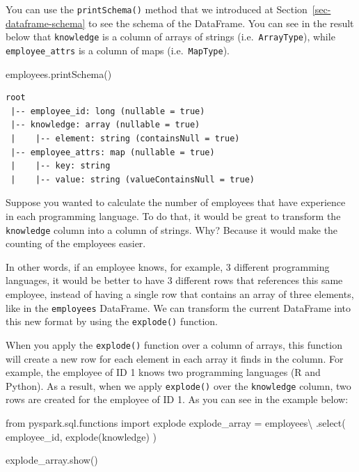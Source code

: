 \documentclass[
  11pt,
  letterpaper,
  DIV=11,
  numbers=noendperiod]{scrreprt}
\newenvironment{Shaded}{\begin{snugshade}}{\end{snugshade}}
\newcommand{\ImportTok}[1]{\textcolor[rgb]{0.00,0.46,0.62}{#1}}
\newcommand{\NormalTok}[1]{\textcolor[rgb]{0.00,0.23,0.31}{#1}}
\newcommand{\OperatorTok}[1]{\textcolor[rgb]{0.37,0.37,0.37}{#1}}
\newcommand{\StringTok}[1]{\textcolor[rgb]{0.13,0.47,0.30}{#1}}
\begin{document}
You can use the \texttt{printSchema()} method that we introduced at
Section~\ref{sec-dataframe-schema} to see the schema of the DataFrame.
You can see in the result below that \texttt{knowledge} is a column of
arrays of strings (i.e.~\texttt{ArrayType}), while
\texttt{employee\_attrs} is a column of maps (i.e.~\texttt{MapType}).

\begin{Shaded}
\begin{Highlighting}[]
\NormalTok{employees.printSchema()}
\end{Highlighting}
\end{Shaded}

\begin{verbatim}
root
 |-- employee_id: long (nullable = true)
 |-- knowledge: array (nullable = true)
 |    |-- element: string (containsNull = true)
 |-- employee_attrs: map (nullable = true)
 |    |-- key: string
 |    |-- value: string (valueContainsNull = true)
\end{verbatim}

Suppose you wanted to calculate the number of employees that have
experience in each programming language. To do that, it would be great
to transform the \texttt{knowledge} column into a column of strings.
Why? Because it would make the counting of the employees easier.

In other words, if an employee knows, for example, 3 different
programming languages, it would be better to have 3 different rows that
references this same employee, instead of having a single row that
contains an array of three elements, like in the \texttt{employees}
DataFrame. We can transform the current DataFrame into this new format
by using the \texttt{explode()} function.

When you apply the \texttt{explode()} function over a column of arrays,
this function will create a new row for each element in each array it
finds in the column. For example, the employee of ID 1 knows two
programming languages (R and Python). As a result, when we apply
\texttt{explode()} over the \texttt{knowledge} column, two rows are
created for the employee of ID 1. As you can see in the example below:

\begin{Shaded}
\begin{Highlighting}[]
\ImportTok{from}\NormalTok{ pyspark.sql.functions }\ImportTok{import}\NormalTok{ explode}
\NormalTok{explode\_array }\OperatorTok{=}\NormalTok{ employees}\OperatorTok{\textbackslash{}}
\NormalTok{    .select(}
        \StringTok{\textquotesingle{}employee\_id\textquotesingle{}}\NormalTok{,}
\NormalTok{        explode(}\StringTok{\textquotesingle{}knowledge\textquotesingle{}}\NormalTok{)}
\NormalTok{    )}

\NormalTok{explode\_array.show()}
\end{Highlighting}
\end{Shaded}
\end{document}
